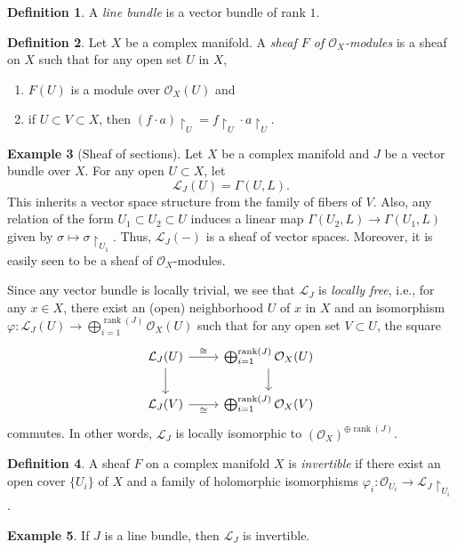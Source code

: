 \documentclass[10pt,letterpaper,cm]{nupset}
\theoremstyle{definition}
\newtheorem{defn}{Definition}[subsection]
\newtheorem{exmp}[defn]{Example}
\theoremstyle{theorem}
\theoremstyle{remark}
\renewcommand{\L}{\mathcal L}
\renewcommand{\O}{\mathcal O}
\newcommand{\1}{\mathbb{1}}
\newcommand{\0}{\vec 0}
\DeclareMathOperator{\rnk}{rank}
\newcommand{\be}{\begin{enumerate}}
\newcommand{\ee}{\end{enumerate}}
\begin{document}
\begin{defn}
A \textit{line bundle} is a vector bundle of rank $1$.
\end{defn}

\begin{defn}
Let $X$ be a complex manifold.  A \textit{sheaf $F$ of $\O_X$-modules} is a sheaf on $X$ such that for any open set $U$ in $X$,
\be[label=(\roman*)]
\item $F(U)$ is a module over $\O_X(U)$ and
\item if $U \subset V \subset X$, then $\left(f\cdot a\right)\restriction_U = f\restriction_U\cdot a\restriction_U$.
\ee
\end{defn}

\begin{exmp}[Sheaf of sections]
Let $X$ be a complex manifold and $J$ be a vector bundle over $X$. For any open $U\subset X$, let $$\L_J(U) = \Gamma\left(U, L\right).$$ This inherits a vector space structure from the family of fibers of $V$. Also, any relation of the form $U_1 \subset U_2 \subset U$ induces a linear map $\Gamma\left(U_2, L\right) \to \Gamma\left(U_1, L\right)$ given by $\sigma \mapsto \sigma\restriction_{U_1}$. Thus, $\L_J\left({-}\right)$ is a sheaf of vector spaces. Moreover, it is easily seen to be a sheaf of $\O_X$-modules. 
\end{exmp}

Since any vector bundle is locally trivial, we see that $\L_J$ is \textit{locally free}, i.e., for any $x\in X$, there exist an (open) neighborhood $U$ of $x$ in $X$ and an isomorphism $\varphi : \L_J(U) \to \bigoplus_{i=1}^{\rnk(J)}\O_X(U)$ such that for any open set $V\subset U$, the square
\[
\begin{tikzcd}
\L_J(U) \arrow[r, "\cong"] \arrow[d] &  \bigoplus_{i=1}^{\rnk(J)}{\O_X(U)} \arrow[d] \\
\L_J(V) \arrow[r, "\cong"']          &  \bigoplus_{i=1}^{\rnk(J)}{\O_X(V)}          
\end{tikzcd}
\]
commutes. In other words, $\L_J$ is locally isomorphic to $\left(\O_X\right)^{\oplus{\rnk(J)}}$.

\begin{defn} 
A sheaf $F$ on a complex manifold $X$ is \textit{invertible} if there exist an open cover $\{U_i\}$ of $X$ and a family of holomorphic isomorphisms $\varphi_i : \O_{U_i} \to \L_J\restriction_{U_i}$.
\end{defn}

\begin{exmp} 
If $J$ is a line bundle, then $\L_J$ is invertible.
\end{exmp}
\end{document}
